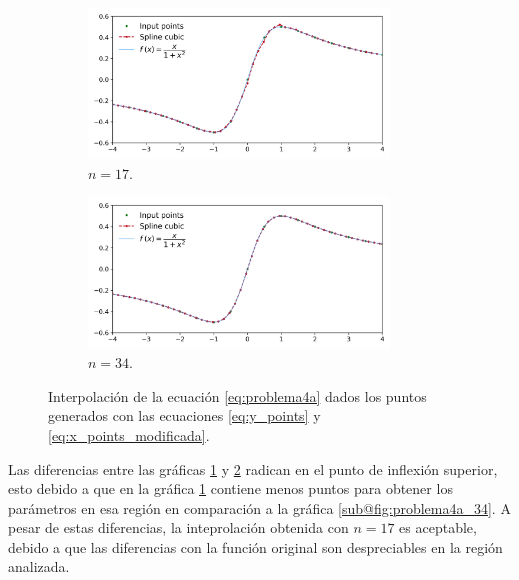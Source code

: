 \begin{figure}[H]
	\centering
	\begin{subfigure}[b]{8cm}
		\includegraphics[width=8cm]{Graphics/problema04a_17.png}
		\caption{$n=17$.}
		\label{fig:problema4a_17}
	\end{subfigure}
	\begin{subfigure}[b]{8cm}
		\includegraphics[width=8cm]{Graphics/problema04a_34.png}
		\caption{$n=34$.}
		\label{fig:problema4a_34}
	\end{subfigure}
	\caption{Interpolación de la ecuación \ref{eq:problema4a} dados los puntos generados con las ecuaciones \ref{eq:y_points} y \ref{eq:x_points_modificada}.}
	\label{fig:problema4a}
\end{figure}

Las diferencias entre las gráficas \ref{fig:problema4a_17} y \ref{fig:problema4a_34} radican en el punto de inflexión superior, esto debido a que en la gráfica \ref{fig:problema4a_17} contiene menos puntos para obtener los parámetros en esa región en comparación a la gráfica \ref{sub@fig:problema4a_34}. A pesar de estas diferencias, la inteprolación obtenida con $n=17$ es aceptable, debido a que las diferencias con la función original son despreciables en la región analizada.

